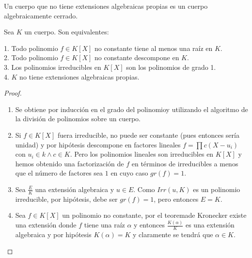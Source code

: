 \begin{definition}
Un cuerpo que no tiene extensiones algebraicas propias es un cuerpo algebraicamente cerrado.
\end{definition}

\begin{proposition}
	Sea $K$ un cuerpo. Son equivalentes:
	
	1. Todo polinomio $f \in K[X]$ no constante tiene al menos una raíz en $K$.\\
	2. Todo polinomio $f \in K[X]$ no constante descompone en $K$. \\
	3. Los polinomios irreducibles en $K[X]$ son los polinomios de grado 1. \\
	4. $K$ no tiene extensiones algebraicas propias. 
\end{proposition}
\begin{proof}
\begin{enumerate}
\item Se obtiene por inducción en el grado del polinomioy utilizando el algoritmo de la división de polinomios sobre un cuerpo.
\item Si $f \in K[X]$ fuera irreducible, no puede ser constante (pues entonces sería unidad) y por hipótesis descompone en factores lineales $f = \prod c(X-u_i)$ con $u_i \in k \land c \in K$. Pero los polinomios lineales son irreducibles en $K[X]$ y hemos obtenido una factorización de $f$ en términos de irreducibles a menos que el número de factores sea $1$ en cuyo caso $gr(f) = 1$. 
\item Sea $\frac{E}{K}$ una extensión algebraica y $u \in E$. Como $Irr(u,K)$ es un polinomio irreducible, por hipótesis, debe ser $gr(f) = 1$, pero entonces $E = K$. 
\item Sea $f \in K[X]$ un polinomio no constante, por el teoremade Kronecker existe una extensión donde $f$ tiene una raíz $\alpha$ y entonces $\frac{K(\alpha)}{K}$ es una extensión algebraica y por hipótesis $K(\alpha) = K$ y claramente se tendrá que $\alpha \in K$. 
\end{enumerate}
\end{proof}

